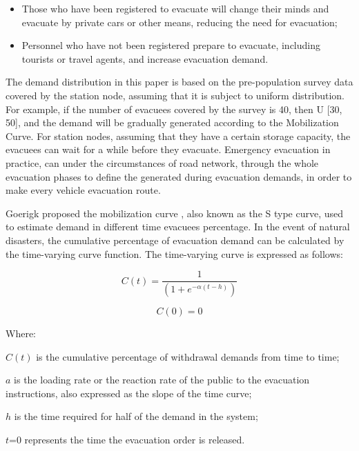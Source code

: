 \documentclass{mcmthesis}
\begin{document}
\begin{itemize}

\item Those who have been registered to evacuate will change their minds and evacuate by private cars or other means, reducing the need for evacuation;
\item Personnel who have not been registered prepare to evacuate, including tourists or travel agents, and increase evacuation demand.

\end{itemize}

The demand distribution in this paper is based on the pre-population survey data covered by the station node, assuming that it is subject to uniform distribution. For example, if the number of evacuees covered by the survey is 40, then U [30, 50], and the demand will be gradually generated according to the Mobilization Curve.
For station nodes, assuming that they have a certain storage capacity, the evacuees can wait for a while before they evacuate. Emergency evacuation in practice, can under the circumstances of road network, through the whole evacuation phases to define the generated during evacuation demands, in order to make every vehicle evacuation route.

Goerigk proposed the mobilization curve \cite{Goerigk2014A,Goerigk2013Branch}, also known as the S type curve, used to estimate demand in different time evacuees percentage. In the event of natural disasters, the cumulative percentage of evacuation demand can be calculated by the time-varying curve function. The time-varying curve is expressed as follows:


\begin{equation}\label{1}
C(t) = \frac{1}{{(1 + {e^{ - \alpha (t - h)}})}}
\end{equation}

\begin{equation}\label{2}
C(0) = 0
\end{equation}

Where:

$C(t)$ is the cumulative percentage of withdrawal demands from time to time;

$a$ is the loading rate or the reaction rate of the public to the evacuation instructions, also expressed as the slope of the time curve;

$h$ is the time required for half of the demand in the system;

$t$=0 represents the time the evacuation order is released.
\end{document}
